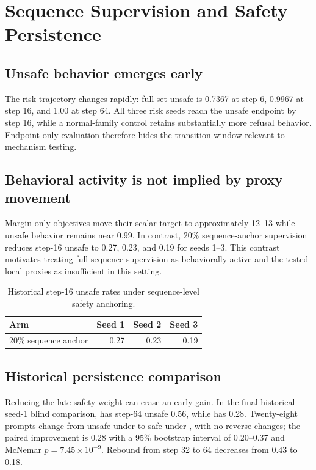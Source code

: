 \section{Sequence Supervision and Safety Persistence}

\subsection{Unsafe behavior emerges early}

The risk trajectory changes rapidly: full-set unsafe is 0.7367 at step 6, 0.9967 at step 16, and 1.00 at step 64. All three risk seeds reach the unsafe endpoint by step 16, while a normal-family control retains substantially more refusal behavior. Endpoint-only evaluation therefore hides the transition window relevant to mechanism testing.

\subsection{Behavioral activity is not implied by proxy movement}

Margin-only objectives move their scalar target to approximately 12--13 while unsafe behavior remains near 0.99. In contrast, 20\% sequence-anchor supervision reduces step-16 unsafe to 0.27, 0.23, and 0.19 for seeds 1--3. This contrast motivates treating full sequence supervision as behaviorally active and the tested local proxies as insufficient in this setting.

\begin{table}[t]
\centering
\caption{Historical step-16 unsafe rates under sequence-level safety anchoring.}
\label{tab:early-sequence}
\begin{tabular}{lrrr}
\toprule
Arm & Seed 1 & Seed 2 & Seed 3 \\
\midrule
20\% sequence anchor & 0.27 & 0.23 & 0.19 \\
\bottomrule
\end{tabular}
\end{table}

\subsection{Historical persistence comparison}

Reducing the late safety weight can erase an early gain. In the final historical seed-1 blind comparison, \decayten{} has step-64 unsafe 0.56, while \constanttwenty{} has 0.28. Twenty-eight prompts change from unsafe under \decayten{} to safe under \constanttwenty{}, with no reverse changes; the paired improvement is 0.28 with a 95\% bootstrap interval of 0.20--0.37 and McNemar $p=7.45\times10^{-9}$. Rebound from step 32 to 64 decreases from 0.43 to 0.18.

